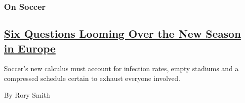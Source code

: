 \begin{enumerate}
\begin{enumerate}
    \hypertarget{on-soccer}{%
    \subsubsection{On Soccer}\label{on-soccer}}

    \hypertarget{six-questions-looming-over-the-new-season-in-europe}{%
    \subsection{\texorpdfstring{\href{/2020/09/11/sports/soccer/premier-league-preview.html}{Six
    Questions Looming Over the New Season in
    Europe}}{Six Questions Looming Over the New Season in Europe}}\label{six-questions-looming-over-the-new-season-in-europe}}

    Soccer's new calculus must account for infection rates, empty
    stadiums and a compressed schedule certain to exhaust everyone
    involved.

    By Rory Smith
  \end{enumerate}
\end{enumerate}

